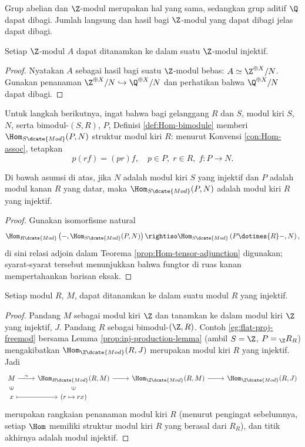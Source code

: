 Grup abelian dan $\Z$-modul merupakan hal yang sama, sedangkan grup aditif $\Q$ dapat dibagi. Jumlah langsung dan hasil bagi $\Z$-modul yang dapat dibagi jelas dapat dibagi.
\begin{lemma}
	Setiap $\Z$-modul $A$ dapat ditanamkan ke dalam suatu $\Z$-modul injektif.
\end{lemma}
\begin{proof}
	Nyatakan $A$ sebagai hasil bagi suatu $\Z$-modul bebas: $A \simeq \Z^{\oplus X}/N$. Gunakan penanaman $\Z^{\oplus X}/N \hookrightarrow \Q^{\oplus X}/N$ dan perhatikan bahwa $\Q^{\oplus X}/N$ dapat dibagi.
\end{proof}

Untuk langkah berikutnya, ingat bahwa bagi gelanggang $R$ dan $S$, modul kiri $S$, $N$, serta bimodul-$(S,R)$, $P$, Definisi \ref{def:Hom-bimodule} memberi $\Hom_{S\dcate{Mod}}(P, N)$ struktur modul kiri $R$: menurut Konvensi \ref{con:Hom-assoc}, tetapkan
\[ p(rf) = (pr)f, \quad p \in P, \; r \in R, \; f: P \to N. \]
\begin{lemma}\label{prop:inj-production-lemma}
	Di bawah asumsi di atas, jika $N$ adalah modul kiri $S$ yang injektif dan $P$ adalah modul kanan $R$ yang datar, maka $\Hom_{S\dcate{Mod}}(P, N)$ adalah modul kiri $R$ yang injektif.
\end{lemma}
\begin{proof}
	Gunakan isomorfisme natural
	\[ \Hom_{R\dcate{Mod}}\left( -, \Hom_{S\dcate{Mod}}(P, N) \right) \rightiso \Hom_{S\dcate{Mod}}\left( P \dotimes{R} -, N\right), \]
	di sini relasi adjoin dalam Teorema \ref{prop:Hom-tensor-adjunction} digunakan; syarat-syarat tersebut menunjukkan bahwa fungtor di ruas kanan mempertahankan barisan eksak.
\end{proof}

\begin{theorem}\label{prop:inj-embedding}
	Setiap modul $R$, $M$, dapat ditanamkan ke dalam suatu modul $R$ yang injektif.
\end{theorem}
\begin{proof}
	Pandang $M$ sebagai modul kiri $\Z$ dan tanamkan ke dalam modul kiri $\Z$ yang injektif, $J$. Pandang $R$ sebagai bimodul-$(\Z,R)$. Contoh \ref{eg:flat-proj-freemod} bersama Lemma \ref{prop:inj-production-lemma} (ambil $S=\Z$, $P = {}_\Z R_R$) mengakibatkan $\Hom_{\Z\dcate{Mod}}(R, J)$ merupakan modul kiri $R$ yang injektif. Jadi
	\[\begin{tikzcd}[row sep=small]
		M \arrow[r, "\sim"] & \Hom_{R\dcate{Mod}}(R,M) \arrow[r] & \Hom_{\Z\dcate{Mod}}(R, M) \arrow[r] & \Hom_{\Z\dcate{Mod}}(R, J) \\
		x \arrow[mapsto, r] \arrow[phantom, u, sloped, "\in" description] & (r \mapsto rx) \arrow[phantom, u, sloped, "\in" description] & &
	\end{tikzcd}\]
	merupakan rangkaian penanaman modul kiri $R$ (menurut pengingat sebelumnya, setiap $\Hom$ memiliki struktur modul kiri $R$ yang berasal dari $R_R$), dan titik akhirnya adalah modul injektif.
\end{proof}

